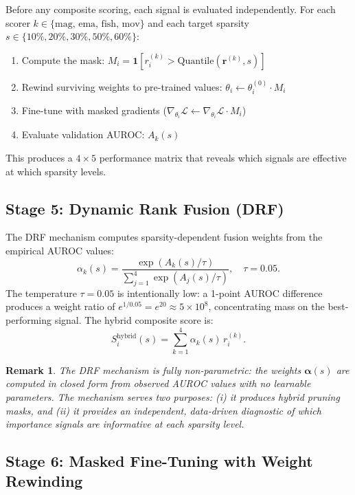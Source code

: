 \documentclass[journal]{IEEEtran}
\newtheorem{remark}{Remark}
\begin{document}
Before any composite scoring, each signal is evaluated
independently.
For each scorer $k \in \{\text{mag, ema, fish, mov}\}$ and each
target sparsity $s \in \{10\%, 20\%, 30\%, 50\%, 60\%\}$:
\begin{enumerate}
  \item Compute the mask:
        $M_i = \mathbf{1}[r_i^{(k)} > \text{Quantile}(\bm{r}^{(k)}, s)]$
  \item Rewind surviving weights to pre-trained values:
        $\theta_i \leftarrow \theta_i^{(0)} \cdot M_i$
  \item Fine-tune with masked gradients
        ($\nabla_{\theta_i}\mathcal{L} \leftarrow
         \nabla_{\theta_i}\mathcal{L} \cdot M_i$)
  \item Evaluate validation AUROC: $A_k(s)$
\end{enumerate}
This produces a $4 \times 5$ performance matrix that reveals
which signals are effective at which sparsity levels.

\subsection{Stage 5: Dynamic Rank Fusion (DRF)}

The DRF mechanism computes sparsity-dependent fusion weights
from the empirical AUROC values:
\begin{equation}
  \alpha_k(s) =
  \frac{\exp(A_k(s)/\tau)}
       {\sum_{j=1}^{4}\exp(A_j(s)/\tau)},
  \quad \tau = 0.05.
  \label{eq:drf}
\end{equation}
The temperature $\tau = 0.05$ is intentionally low: a 1-point
AUROC difference produces a weight ratio of
$e^{1/0.05} = e^{20} \approx 5 \times 10^8$, concentrating
mass on the best-performing signal.
The hybrid composite score is:
\begin{equation}
  S_i^{\text{hybrid}}(s) = \sum_{k=1}^{4} \alpha_k(s)\, r_i^{(k)}.
  \label{eq:hybrid}
\end{equation}

\begin{remark}
The DRF mechanism is fully non-parametric: the weights
$\bm{\alpha}(s)$ are computed in closed form from observed
AUROC values with no learnable parameters.
The mechanism serves two purposes: (i) it produces hybrid
pruning masks, and (ii) it provides an independent,
data-driven diagnostic of which importance signals are
informative at each sparsity level.
\end{remark}

\subsection{Stage 6: Masked Fine-Tuning with Weight Rewinding}
\end{document}
